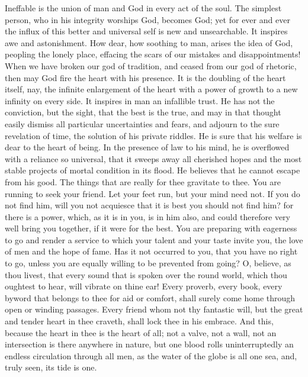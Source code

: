 \documentclass{article}
\begin{document}
Ineffable is the union of man and God in every act of the soul. The simplest person, who in his integrity worships God, becomes God; yet for ever and ever the influx of this better and universal self is new and unsearchable. It inspires awe and astonishment. How dear, how soothing to man, arises the idea of God, peopling the lonely place, effacing the scars of our mistakes and disappointments! When we have broken our god of tradition, and ceased from our god of rhetoric, then may God fire the heart with his presence. It is the doubling of the heart itself, nay, the infinite enlargement of the heart with a power of growth to a new infinity on every side. It inspires in man an infallible trust. He has not the conviction, but the sight, that the best is the true, and may in that thought easily dismiss all particular uncertainties and fears, and adjourn to the sure revelation of time, the solution of his private riddles. He is sure that his welfare is dear to the heart of being. In the presence of law to his mind, he is overflowed with a reliance so universal, that it sweeps away all cherished hopes and the most stable projects of mortal condition in its flood. He believes that he cannot escape from his good. The things that are really for thee gravitate to thee. You are running to seek your friend. Let your feet run, but your mind need not. If you do not find him, will you not acquiesce that it is best you should not find him? for there is a power, which, as it is in you, is in him also, and could therefore very well bring you together, if it were for the best. You are preparing with eagerness to go and render a service to which your talent and your taste invite you, the love of men and the hope of fame. Has it not occurred to you, that you have no right to go, unless you are equally willing to be prevented from going? O, believe, as thou livest, that every sound that is spoken over the round world, which thou oughtest to hear, will vibrate on thine ear! Every proverb, every book, every byword that belongs to thee for aid or comfort, shall surely come home through open or winding passages. Every friend whom not thy fantastic will, but the great and tender heart in thee craveth, shall lock thee in his embrace. And this, because the heart in thee is the heart of all; not a valve, not a wall, not an intersection is there anywhere in nature, but one blood rolls uninterruptedly an endless circulation through all men, as the water of the globe is all one sea, and, truly seen, its tide is one.
\end{document}

